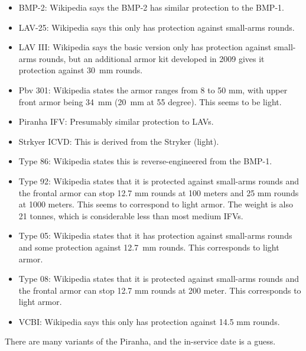 {{\begin{itemize}
            \item BMP-2: Wikipedia says the BMP-2 has similar protection to the BMP-1.
            \item LAV-25: Wikipedia says this only has protection against small-arms rounds.
            \item LAV III: Wikipedia says the basic version only has protection against small-arms rounds, but an additional armor kit developed in 2009 gives it protection against 30~mm rounds.
            \item Pbv 301: Wikipedia states the armor ranges from 8 to 50 mm, with upper front armor being 34~mm (20~mm at 55 degree). This seems to be light.
            \item Piranha IFV: Presumably similar protection to LAVs.
            \item Strkyer ICVD: This is derived from the Stryker (light).
            \item Type 86: Wikipedia states this is reverse-engineered from the BMP-1.
            \item Type 92: Wikipedia states that it is protected against small-arms rounds and the frontal armor can stop 12.7 mm rounds at 100 meters and 25 mm rounds at 1000 meters. This seems to correspond to light armor. The weight is also 21 tonnes, which is considerable less than most medium IFVs.
            \item Type 05: Wikipedia states that it has protection against small-arms rounds and some protection against 12.7~mm rounds. This corresponds to light armor.
            \item Type 08: Wikipedia states that it is protected against small-arms rounds and the frontal armor can stop 12.7 mm rounds at 200 meter. This corresponds to light armor.
            \item VCBI: Wikipedia says this only has protection against 14.5 mm rounds.
        \end{itemize}

        There are many variants of the Piranha, and the in-service date is a guess.
    }


}

